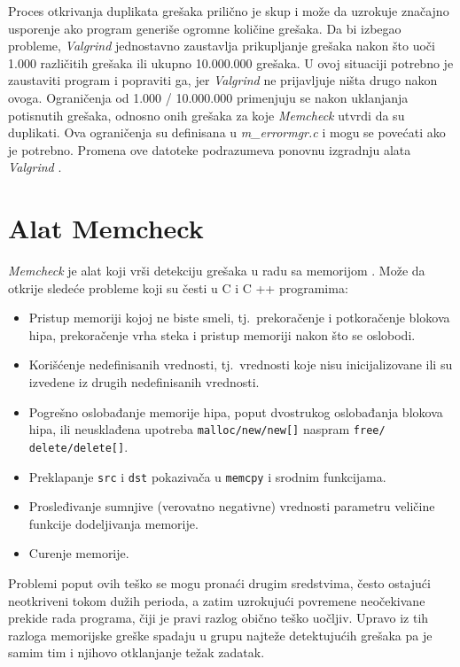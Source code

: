 \documentclass[12pt,oneside]{memoir}
\theoremstyle{plain}
\theoremstyle{definition}
\begin{document}
Proces otkrivanja duplikata grešaka prilično je skup i može da uzrokuje značajno usporenje ako program generiše ogromne količine grešaka. Da bi izbegao probleme, \textit{Valgrind} jednostavno zaustavlja prikupljanje grešaka nakon što uoči 1.000 različitih grešaka ili ukupno 10.000.000 grešaka. U ovoj situaciji potrebno je zaustaviti program i popraviti ga, jer \textit{Valgrind} ne prijavljuje ništa drugo nakon ovoga. Ograničenja od 1.000 / 10.000.000 primenjuju se nakon uklanjanja potisnutih grešaka, odnosno onih grešaka za koje \textit{Memcheck} utvrdi da su duplikati. Ova ograničenja su definisana u \textit{m\_errormgr.c} i mogu se povećati ako je potrebno. Promena ove datoteke podrazumeva ponovnu izgradnju alata \textit{Valgrind} \cite{ValgrindCore}.

\section{Alat Memcheck}
\textit{Memcheck} je alat koji vrši detekciju grešaka u radu sa memorijom \cite{Memcheck}. Može da otkrije sledeće probleme koji su česti u C i C ++ programima:
\begin{itemize}
\item Pristup memoriji kojoj ne biste smeli, tj.~prekoračenje i potkoračenje blokova hipa, prekoračenje vrha steka i pristup memoriji nakon što se oslobodi.
\item Korišćenje nedefinisanih vrednosti, tj.~vrednosti koje nisu inicijalizovane ili su izvedene iz drugih nedefinisanih vrednosti.
\item Pogrešno oslobađanje memorije hipa, poput dvostrukog oslobađanja blokova hipa, ili neusklađena upotreba \texttt{malloc/new/new[]} naspram \texttt{free/ delete/delete[]}.
\item Preklapanje \texttt{src} i \texttt{dst} pokazivača u \texttt{memcpy} i srodnim funkcijama.
\item Prosleđivanje sumnjive (verovatno negativne) vrednosti parametru veličine funkcije dodeljivanja memorije.
\item Curenje memorije.
\end{itemize}

Problemi poput ovih teško se mogu pronaći drugim sredstvima, često ostajući neotkriveni tokom dužih perioda, a zatim uzrokujući povremene neočekivane prekide rada programa, čiji je pravi razlog obično teško uočljiv. Upravo iz tih razloga memorijske greške spadaju u grupu najteže detektujućih grešaka pa je samim tim i njihovo otklanjanje težak zadatak.
\end{document}
